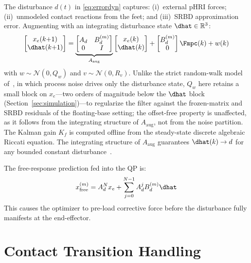 The disturbance $d(t)$ in \eqref{eq:errordyn} captures: (i)~external pHRI
forces; (ii)~unmodeled contact reactions from the feet; and (iii)~SRBD
approximation error.
Augmenting with an integrating disturbance state $\dhat\in\mathbb{R}^3$:
\begin{equation}\label{eq:augstate}
  \begin{bmatrix}x_e(k{+}1)\\\dhat(k{+}1)\end{bmatrix}
  =\underbrace{\begin{bmatrix}A_d & B_d^{(m)} \\ 0 & I\end{bmatrix}}_{A_{\text{aug}}}
  \begin{bmatrix}x_e(k)\\\dhat(k)\end{bmatrix}
  +\begin{bmatrix}B_d^{(m)}\\0\end{bmatrix}\Fmpc(k)+w(k)
\end{equation}
with $w\sim\mathcal{N}(0,Q_w)$ and $v\sim\mathcal{N}(0,R_v)$.
Unlike the strict random-walk model of~\cite{cao2026impedance}, in which
process noise drives only the disturbance state, $Q_w$ here retains a
small block on $x_e$---two orders of magnitude below the $\dhat$
block (Section~\ref{sec:simulation})---to regularize the filter against
the frozen-matrix and SRBD residuals of the floating-base setting; the
offset-free property is unaffected, as it follows from the integrating
structure of $A_{\text{aug}}$, not from the noise partition.
The Kalman gain $K_f$ is computed offline from the steady-state discrete
algebraic Riccati equation.
The integrating structure of $A_{\text{aug}}$ guarantees $\dhat(k)\to d$
for any bounded constant disturbance~\cite{cao2004antiwindup}.

The free-response prediction fed into the QP is:
\begin{equation}\label{eq:freeresponse}
  x_{\text{free}}^{(m)} = A_d^N x_e + \sum_{j=0}^{N-1}A_d^j B_d^{(m)}\dhat
\end{equation}
This causes the optimizer to pre-load corrective force before the
disturbance fully manifests at the end-effector.

\section{Contact Transition Handling}\label{sec:switching}


